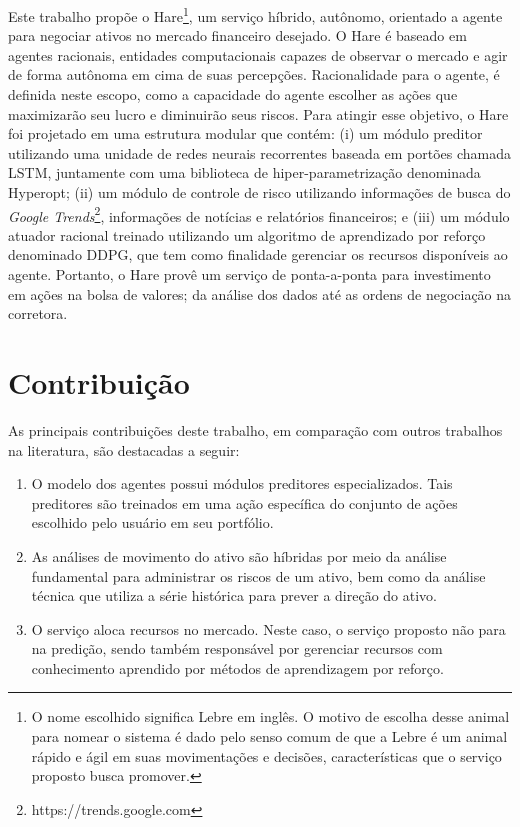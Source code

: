 Este trabalho propõe o Hare\footnote{O nome escolhido significa Lebre em inglês. O motivo de escolha desse animal para nomear o sistema é dado pelo senso comum de que a Lebre é um animal rápido e ágil em suas movimentações e decisões, características que o serviço proposto busca promover.}, um serviço híbrido, autônomo, orientado a agente para negociar ativos no mercado financeiro desejado. O Hare é baseado em agentes racionais, entidades computacionais capazes de observar o mercado e agir de forma autônoma em cima de suas percepções. Racionalidade para o agente, é definida neste escopo, como a capacidade do agente escolher as ações que maximizarão seu lucro e diminuirão seus riscos. Para atingir esse objetivo, o Hare foi projetado em uma estrutura modular que contém: (i) um módulo preditor utilizando uma unidade de redes neurais recorrentes baseada em portões chamada \acrfull{LSTM}, juntamente com uma biblioteca de hiper-parametrização denominada Hyperopt; (ii) um módulo de controle de risco utilizando informações de busca do \emph{Google Trends}\footnote{https://trends.google.com}, informações de notícias e relatórios financeiros; e (iii) um módulo atuador racional treinado utilizando um algoritmo de aprendizado por reforço denominado \acrlong{DDPG}, que tem como finalidade gerenciar os recursos disponíveis ao agente. Portanto, o Hare provê um serviço de ponta-a-ponta para investimento em ações na bolsa de valores; da análise dos dados até as ordens de negociação na corretora.

\section{Contribuição}

As principais contribuições deste trabalho, em comparação com outros trabalhos na literatura, são destacadas a seguir:

\begin{enumerate}
    \item O modelo dos agentes possui módulos preditores especializados. Tais preditores são treinados em uma ação específica do conjunto de ações escolhido pelo usuário em seu portfólio.
    \item As análises de movimento do ativo são híbridas por meio da análise fundamental para administrar os riscos de um ativo, bem como da análise técnica que utiliza a série histórica para prever a direção do ativo.
    \item O serviço aloca recursos no mercado. Neste caso, o serviço proposto não para na predição, sendo também responsável por gerenciar recursos com conhecimento aprendido por métodos de aprendizagem por reforço.
\end{enumerate}

